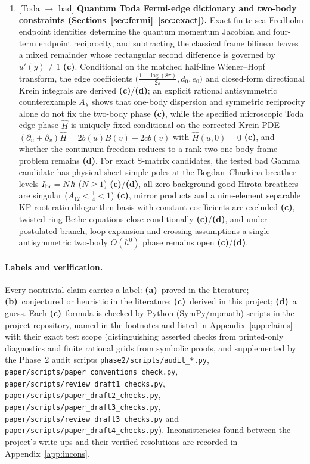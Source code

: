 \documentclass[11pt,a4paper]{article}
\newcommand{\lab}[1]{{\normalfont\sffamily\footnotesize\bfseries(#1)}}
\newcommand{\La}{\lab{a}}
\newcommand{\Lb}{\lab{b}}
\newcommand{\Lc}{\lab{c}}
\newcommand{\Ld}{\lab{d}}
\newcommand{\eqtag}[2]{{\normalfont\sffamily\footnotesize\textcolor{#1}{[#2]}}}
\newcommand{\scr}[1]{\nolinkurl{#1}}
\newcommand{\hb}{\hbar}
\theoremstyle{remark}
\begin{document}
\begin{enumerate}
\item \eqtag{red!60!black}{Toda $\to$ bad} \textbf{Quantum Toda Fermi-edge dictionary and two-body constraints (Sections~\ref{sec:fermi}--\ref{sec:exact}).} Exact finite-sea Fredholm endpoint identities determine the quantum momentum Jacobian and four-term endpoint reciprocity, and subtracting the classical frame bilinear leaves a mixed remainder whose rectangular second difference is governed by $u'(y)\neq1$ \Lc. Conditional on the matched half-line Wiener--Hopf transform, the edge coefficients $\big(\frac{1-\log(8\pi)}{2\pi},d_0,e_0\big)$ and closed-form directional Krein integrals are derived \Lc/\Ld; an explicit rational antisymmetric counterexample $A_\lambda$ shows that one-body dispersion and symmetric reciprocity alone do not fix the two-body phase \Lc, while the specified microscopic Toda edge phase $\widehat H$ is uniquely fixed conditional on the corrected Krein PDE $(\partial_u+\partial_v)\widehat H=2b(u)B(v)-2cb(v)$ with $\widehat H(u,0)=0$ \Lc, and whether the continuum freedom reduces to a rank-two one-body frame problem remains \Ld. For exact S-matrix candidates, the tested bad Gamma candidate has physical-sheet simple poles at the Bogdan--Charkina breather levels $I_{\rm br}=N\hb$ ($N\ge1$) \Lc/\Ld, all zero-background good Hirota breathers are singular ($A_{12}<\tfrac14<1$) \Lc, mirror products and a nine-element separable KP root-ratio dilogarithm basis with constant coefficients are excluded \Lc, twisted ring Bethe equations close conditionally \Lc/\Ld, and under postulated branch, loop-expansion and crossing assumptions a single antisymmetric two-body $O(\hb^0)$ phase remains open \Lc/\Ld.
\end{enumerate}

\paragraph{Labels and verification.} Every nontrivial claim carries a label: \La\ proved in the literature; \Lb\ conjectured or heuristic in the literature; \Lc\ derived in this project; \Ld\ a guess. Each \Lc\ formula is checked by Python (SymPy/mpmath) scripts in the project repository, named in the footnotes and listed in Appendix~\ref{app:claims} with their exact test scope (distinguishing asserted checks from printed-only diagnostics and finite rational grids from symbolic proofs, and supplemented by the Phase~2 audit scripts \nolinkurl{phase2/scripts/audit_*.py}, \scr{paper/scripts/paper_conventions_check.py}, \scr{paper/scripts/review_draft1_checks.py}, \scr{paper/scripts/paper_draft2_checks.py}, \scr{paper/scripts/paper_draft3_checks.py}, \scr{paper/scripts/review_draft3_checks.py} and \scr{paper/scripts/paper_draft4_checks.py}). Inconsistencies found between the project's write-ups and their verified resolutions are recorded in Appendix~\ref{app:incons}.
\end{document}
